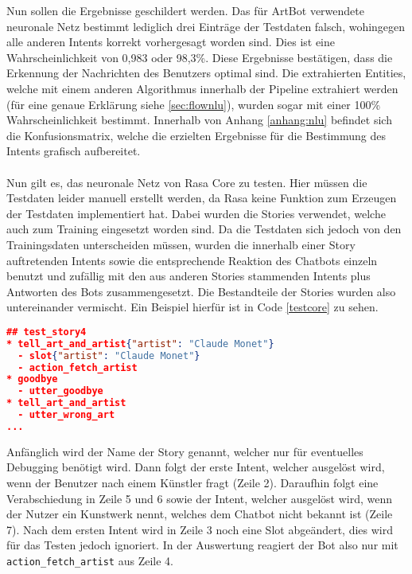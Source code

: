 Nun sollen die Ergebnisse geschildert werden. Das für ArtBot verwendete neuronale Netz bestimmt lediglich drei Einträge der Testdaten falsch, wohingegen alle anderen Intents korrekt vorhergesagt worden sind. Dies ist eine Wahrscheinlichkeit von 0,983 oder 98,3\%. Diese Ergebnisse bestätigen, dass die Erkennung der Nachrichten des Benutzers optimal sind. Die extrahierten Entities, welche mit einem anderen Algorithmus innerhalb der Pipeline extrahiert werden (für eine genaue Erklärung siehe \ref{sec:flownlu}), wurden sogar mit einer 100\% Wahrscheinlichkeit bestimmt. Innerhalb von Anhang \ref{anhang:nlu} befindet sich die Konfusionsmatrix, welche die erzielten Ergebnisse für die Bestimmung des Intents grafisch aufbereitet. \\
\\
Nun gilt es, das neuronale Netz von Rasa Core zu testen. Hier müssen die Testdaten leider manuell erstellt werden, da Rasa keine Funktion zum Erzeugen der Testdaten implementiert hat. Dabei wurden die Stories verwendet, welche auch zum Training eingesetzt worden sind. Da die Testdaten sich jedoch von den Trainingsdaten unterscheiden müssen, wurden die innerhalb einer Story auftretenden Intents sowie die entsprechende Reaktion des Chatbots einzeln benutzt und zufällig mit den aus anderen Stories stammenden Intents plus Antworten des Bots zusammengesetzt. Die Bestandteile der Stories wurden also untereinander vermischt. Ein Beispiel hierfür ist in Code \ref{testcore} zu sehen.
\begin{lstlisting}[caption={Struktur eines Testfalles für Rasa Core.}, label=testcore, lineskip=1pt, language=json, morekeywords={test_story4, artist, tell_art_and_artist, goodbye, tell_art_and_artist}]
## test_story4
* tell_art_and_artist{"artist": "Claude Monet"}
  - slot{"artist": "Claude Monet"}
  - action_fetch_artist
* goodbye
  - utter_goodbye
* tell_art_and_artist
  - utter_wrong_art
...
\end{lstlisting}
Anfänglich wird der Name der Story genannt, welcher nur für eventuelles Debugging benötigt wird. Dann folgt der erste Intent, welcher ausgelöst wird, wenn der Benutzer nach einem Künstler fragt (Zeile 2). Daraufhin folgt eine Verabschiedung in Zeile 5 und 6 sowie der Intent, welcher ausgelöst wird, wenn der Nutzer ein Kunstwerk nennt, welches dem Chatbot nicht bekannt ist (Zeile 7). Nach dem ersten Intent wird in Zeile 3 noch eine Slot abgeändert, dies wird für das Testen jedoch ignoriert. In der Auswertung reagiert der Bot also nur mit \texttt{action\_fetch\_artist} aus Zeile 4.\\
